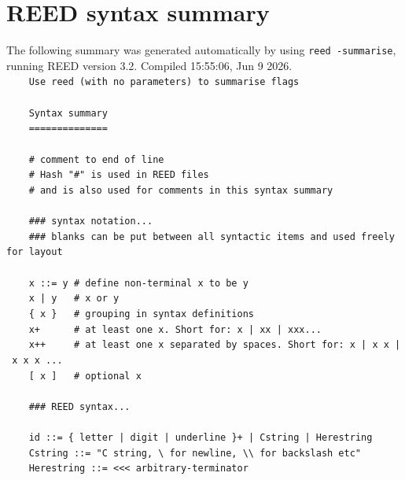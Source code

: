 \section{REED syntax summary}\label{syntaxSummary}
The following summary was generated automatically by using \texttt{reed~-summarise}, running REED version 3.2. Compiled 15:55:06, Jun  9 2026.
\vskip 5mm
{\tt\noindent\hbox{}~~~~Use~reed~(with~no~parameters)~to~summarise~flags\\
\hbox{}\\
\hbox{}~~~~Syntax~summary\\
\hbox{}~~~~==============\\
\hbox{}\\
\hbox{}~~~~{\rm \#~comment~to~end~of~line}\\
\hbox{}~~~~{\rm \#~Hash~"\texttt{\#}"~is~used~in~REED~files}\\
\hbox{}~~~~{\rm \#~and~is~also~used~for~comments~in~this~syntax~summary}\\
\hbox{}\\
\hbox{}~~~~{\rm \#\#\#~syntax~notation...}\\
\hbox{}~~~~{\rm \#\#\#~blanks~can~be~put~between~all~syntactic~items~and~used~freely~for~layout~}\\
\hbox{}\\
\hbox{}~~~~x~::=~y~{\rm \#~define~non-terminal~\texttt{x}~to~be~\texttt{y}}\\
\hbox{}~~~~x~\texttt{|}~y~~~{\rm \#~\texttt{x}~or~\texttt{y}}\\
\hbox{}~~~~\{~x~\}~~~{\rm \#~grouping~in~syntax~definitions}\\
\hbox{}~~~~x+~~~~~~{\rm \#~at~least~one~\texttt{x}.~Short~for:~\texttt{x~\texttt{|}~xx~\texttt{|}~xxx}...}\\
\hbox{}~~~~x++~~~~~{\rm \#~at~least~one~\texttt{x}~separated~by~spaces.~Short~for:~\texttt{x~\texttt{|}~x~x~\texttt{|}~x~x~x}~...~}\\
\hbox{}~~~~[~x~]~~~{\rm \#~optional~\texttt{x}}\\
\hbox{}\\
\hbox{}~~~~{\rm \#\#\#~REED~syntax...}\\
\hbox{}\\
\hbox{}~~~~id~::=~\{~letter~\texttt{|}~digit~\texttt{|}~underline~\}+~\texttt{|}~Cstring~\texttt{|}~Herestring\\
\hbox{}~~~~Cstring~::=~"C~string,~\textbackslash\@n~for~newline,~\textbackslash\@\textbackslash\@~for~backslash~etc"~\\
\hbox{}~~~~Herestring~::=~<{}<{}<~arbitrary-terminator\\
}
